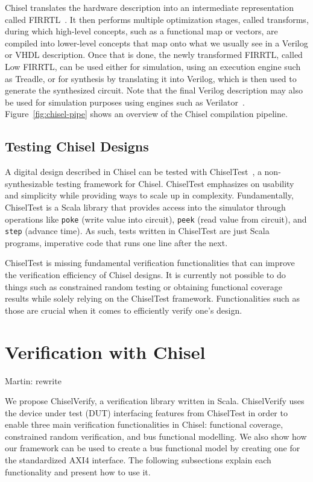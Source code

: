 \documentclass[conference]{IEEEtran}
\newcommand{\martin}[1]{{\color{blue} Martin: #1}}
\begin{document}
Chisel translates the hardware description into an intermediate representation called FIRRTL~\cite{firrtl}. 
It then performs multiple optimization stages, called transforms, during which high-level concepts, such as a functional map or vectors, are compiled into lower-level concepts that map onto what we usually see in a Verilog or VHDL description. 
Once that is done, the newly transformed FIRRTL, called Low FIRRTL, can be used either for simulation, using an execution engine such as Treadle, or for synthesis by translating it into Verilog, which is then used to generate the synthesized circuit. 
Note that the final Verilog description may also be used for simulation purposes using engines such as Verilator~\cite{verilator}. 
Figure~\ref{fig:chisel-pipe} shows an overview of the Chisel compilation pipeline.

\subsection{Testing Chisel Designs}
A digital design described in Chisel can be tested with ChiselTest~\cite{chisel:tester2}, a non-synthesizable testing framework for Chisel.
ChiselTest emphasizes on usability and simplicity while providing ways to scale up in complexity.
Fundamentally, ChiselTest is a Scala library that provides access into the simulator through
operations like \texttt{poke} (write value into circuit), \texttt{peek} (read value from circuit), and \texttt{step} (advance time).
As such, tests written in ChiselTest are just Scala programs, imperative code that runs one line after the next.

ChiselTest is missing fundamental verification functionalities that can improve the verification efficiency of Chisel designs. 
It is currently not possible to do things such as constrained random testing or obtaining functional coverage results while solely relying on the ChiselTest framework. 
Functionalities such as those are crucial when it comes to efficiently verify one's design.

\section{Verification with Chisel}

\martin{rewrite}


We propose ChiselVerify, a verification library written in Scala. 
ChiselVerify uses the device under test (DUT) interfacing features from ChiselTest in order to enable three main verification functionalities in Chisel: functional coverage, constrained random verification, and bus functional modelling. 
We also show how our framework can be used to create a bus functional model by creating one for the standardized AXI4 interface. 
The following subsections explain each functionality and present how to use it.
\end{document}
